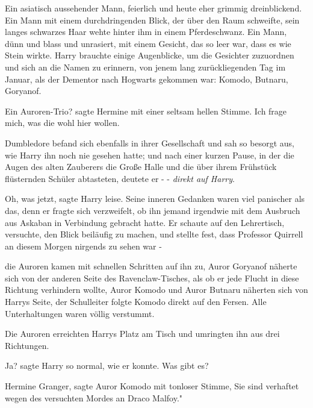 Ein asiatisch aussehender Mann, feierlich und heute eher grimmig dreinblickend.
Ein Mann mit einem durchdringenden Blick, der über den Raum schweifte, sein
langes schwarzes Haar wehte hinter ihm in einem Pferdeschwanz. Ein Mann, dünn
und blass und unrasiert, mit einem Gesicht, das so leer war, dass es wie Stein
wirkte. Harry brauchte einige Augenblicke, um die Gesichter zuzuordnen und sich
an die Namen zu erinnern, von jenem lang zurückliegenden Tag im Januar, als der
Dementor nach Hogwarts gekommen war: Komodo, Butnaru, Goryanof.

\glqq{}Ein Auroren-Trio?\grqq{} sagte Hermine mit einer seltsam hellen Stimme.
\glqq{}Ich frage mich, was die wohl hier wollen.\grqq{}

Dumbledore befand sich ebenfalls in ihrer Gesellschaft und sah so besorgt aus,
wie Harry ihn noch nie gesehen hatte; und nach einer kurzen Pause, in der die
Augen des alten Zauberers die Große Halle und die über ihrem Frühstück
flüsternden Schüler abtasteten, deutete er - -\emph{ direkt auf Harry}.

\glqq{}Oh, was jetzt\grqq{}, sagte Harry leise. Seine inneren Gedanken waren viel
panischer als das, denn er fragte sich verzweifelt, ob ihn jemand irgendwie mit
dem Ausbruch aus Askaban in Verbindung gebracht hatte. Er schaute auf den
Lehrertisch, versuchte, den Blick beiläufig zu machen, und stellte fest, dass
Professor Quirrell an diesem Morgen nirgends zu sehen war -

die Auroren kamen mit schnellen Schritten auf ihn zu, Auror Goryanof näherte
sich von der anderen Seite des Ravenclaw-Tisches, als ob er jede Flucht in diese
Richtung verhindern wollte, Auror Komodo und Auror Butnaru näherten sich von
Harrys Seite, der Schulleiter folgte Komodo direkt auf den Fersen. Alle
Unterhaltungen waren völlig verstummt.

Die Auroren erreichten Harrys Platz am Tisch und umringten ihn aus drei
Richtungen.

\glqq{}Ja?\grqq{} sagte Harry so normal, wie er konnte. \glqq{}Was gibt es?\grqq{}

\glqq{}Hermine Granger\grqq{}, sagte Auror Komodo mit tonloser Stimme, \glqq{}Sie
sind verhaftet wegen des versuchten Mordes an Draco Malfoy."

